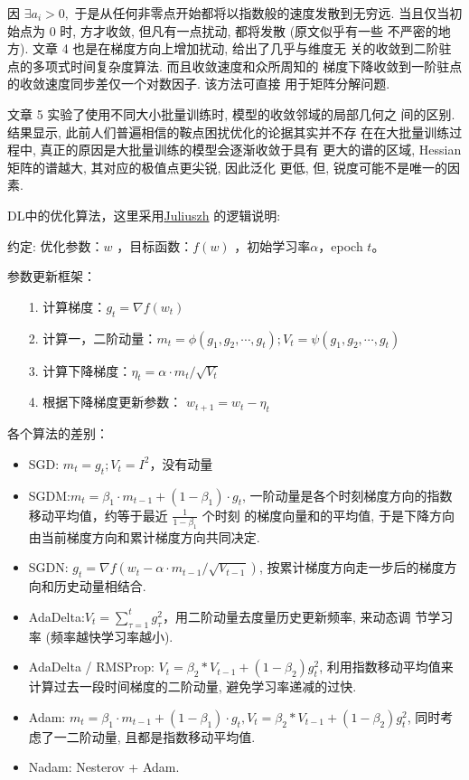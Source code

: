 \documentclass[UTF8]{ctexart}
\begin{document}
因 $\exists a_i > 0,$ 于是从任何非零点开始都将以指数般的速度发散到无穷远. 
当且仅当初始点为 0 时, 方才收敛, 但凡有一点扰动, 都将发散 (原文似乎有一些
不严密的地方). 文章 4 也是在梯度方向上增加扰动, 给出了几乎与维度无
关的收敛到二阶驻点的多项式时间复杂度算法. 而且收敛速度和众所周知的
梯度下降收敛到一阶驻点的收敛速度同步差仅一个对数因子. 该方法可直接
用于矩阵分解问题. 

文章 5 实验了使用不同大小批量训练时, 模型的收敛邻域的局部几何之
间的区别. 结果显示, 此前人们普遍相信的鞍点困扰优化的论据其实并不存
在在大批量训练过程中, 真正的原因是大批量训练的模型会逐渐收敛于具有
更大的谱的区域, Hessian 矩阵的谱越大, 其对应的极值点更尖锐, 因此泛化
更低, 但, 锐度可能不是唯一的因素.

DL中的优化算法，这里采用\href{https://zhuanlan.zhihu.com/p/32230623}{Juliuszh}
的逻辑说明:

约定: 优化参数：$w$ ，目标函数：$f(w)$ ，初始学习率$\alpha$，epoch $t$。

参数更新框架：
\begin{itemize}
	\item[1.] 计算梯度：$g_{t}=\nabla f\left(w_{t}\right)$
	\item[2.] 计算一，二阶动量：$m_{t}=\phi\left(g_{1}, g_{2},
	 \cdots, g_{t}\right); V_{t}=\psi\left(g_{1}, g_{2}, \cdots, g_{t}\right)$
	\item[3.] 计算下降梯度：$\eta_{t}=\alpha \cdot m_{t} / \sqrt{V_{t}}$
	\item[4.] 根据下降梯度更新参数： $w_{t+1}=w_{t}-\eta_{t}$
\end{itemize}

各个算法的差别：
\begin{itemize}
	\item SGD: $m_t=g_t; V_t=I^2$，没有动量
	\item SGDM:$m_{t}=\beta_{1} \cdot m_{t-1}+\left(1-\beta_{1}\right) \cdot g_{t}$,
	一阶动量是各个时刻梯度方向的指数移动平均值，约等于最近 $\frac{1}{1 - \beta_1}$ 个时刻
	的梯度向量和的平均值, 于是下降方向由当前梯度方向和累计梯度方向共同决定.
	\item SGDN: $g_{t}=\nabla f\left(w_{t}-\alpha \cdot m_{t-1} / \sqrt{V_{t-1}}\right)$,
	按累计梯度方向走一步后的梯度方向和历史动量相结合.
	\item AdaDelta:$V_{t}=\sum_{\tau=1}^{t} g_{\tau}^{2}$，用二阶动量去度量历史更新频率, 来动态调
	节学习率 (频率越快学习率越小).
	\item AdaDelta / RMSProp: $V_{t}=\beta_{2} * V_{t-1}+\left(1-\beta_{2}\right) g_{t}^{2}$,
	利用指数移动平均值来计算过去一段时间梯度的二阶动量, 避免学习率递减的过快.
	\item Adam: $m_{t}=\beta_{1} \cdot m_{t-1}+\left(1-\beta_{1}\right) \cdot g_{t}, 
	V_{t}=\beta_{2} * V_{t-1}+\left(1-\beta_{2}\right) g_{t}^{2}$,
	同时考虑了一二阶动量, 且都是指数移动平均值.
	\item Nadam: Nesterov + Adam.
\end{itemize}
\end{document}
